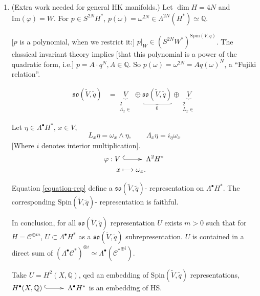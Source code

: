 \begin{enumerate}
$\varphi$ is a morphism of
$\text{Spin}(V,q)$-modules
[representations].
Thus, $\varphi$ is a morphism of Hodge
structures.

[This finishes the work for K3 surfaces.
For general HK manifolds we need to work a
bit more,
how to embed all cohomology groups?
In fact, this is where we will use the $m$
in $H=\mathcal{C}^{\oplus m}$.]

\item (Extra work needed for general HK
manifolds.)
Let $\dim H=4N$ and $\text{Im}(\varphi)=W$.
For $p \in S^{2N}H^*$,
$p(\omega)=\omega^{2N}\in
\Lambda^{2N}(H^*)\simeq\mathbb{Q}$.

[$p$ is a polynomial, when we restrict it:]
$p|_W \in (S^{2N}W^* )^{\text{Spin}(V,q)}$.
The classical invariant theory implies [that
this polynomial
is a power of the quadratic form, i.e.]
$p = A \cdot q^N, A \in \mathbb{Q}$.
So $p(\omega)=\omega^{2N}=A q(\omega)^N$,
a ``Fujiki relation''.

$$
\begin{aligned}
\mathfrak{so}(\tilde{V},\tilde{q})&=
\underbrace{V}_{\substack{2 \\ \Lambda_x\in}}
\oplus
\underbrace{\mathfrak{so}(\tilde{V},\tilde{q}
)}_{0}
\oplus \underbrace{V}_{\substack{2 \\
L_x\in}}
\end{aligned}
$$

\noindent
Let $\eta \in \Lambda^\bullet H^*$, $x \in
V$,
\begin{equation}
\label{equation-rep}
L_x \eta=\omega_x \wedge \eta,\qquad
\Lambda_x\eta=i_\eta \omega_x
\end{equation}
[Where $i$ denotes interior multiplication].
$$
\begin{aligned}
\varphi: V &\xymatrix{\ar@{^{(}->}[r]&}
\Lambda^2H^*\\
x &\longmapsto \omega_x.
\end{aligned}
$$

\begin{proposition}
\label{proposition-rep}
Equation \ref{equation-rep} define a $
\mathfrak{so}(\tilde{V},\tilde{q})$-
representation
on $\Lambda^\bullet H^*$.
The corresponding
$\text{Spin}(\tilde{V},\tilde{q})$-
representation
is faithful.
\end{proposition}

In conclusion,
for all $\mathfrak{so}(\tilde{V},\tilde{q})$
representation $U$
exists $m>0$ such that for
$H=\mathcal{C}^{\oplus m}$,
$U \subset \Lambda^\bullet H^*$
as a $\mathfrak{so}(\tilde{V},\tilde{q})$
subrepresentation.
$U$ is contained in a direct sum of
 $(\Lambda^\bullet \mathcal{C}^* )^{\otimes
 i}
\simeq \Lambda^\bullet({\mathcal{C}^*
}^{\oplus i})$.

Take $U = H^2(X,\mathbb{Q})$,
qed an embedding of
$\text{Spin}(\tilde{V},\tilde{q})$
representations,
$H^\bullet(X,\mathbb{Q})
\xymatrix{\ar@{^{(}->}[r]&} \Lambda^\bullet
H^*$
is an embedding of HS.
\end{enumerate}

